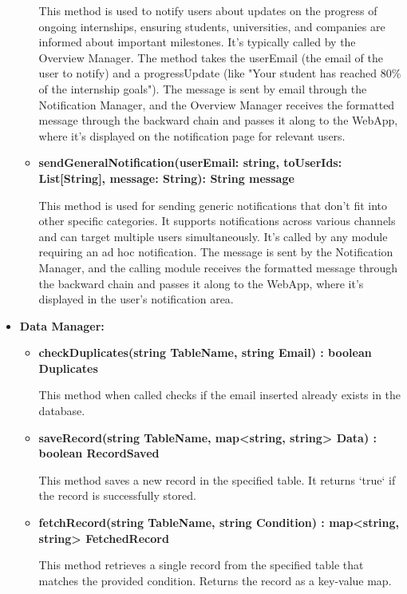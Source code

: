 \begin{itemize}
\begin{itemize}
    This method is used to notify users about updates on the progress of ongoing internships, ensuring students, universities, and companies are informed about important milestones. It’s typically called by the Overview Manager.
    The method takes the userEmail (the email of the user to notify) and a progressUpdate (like "Your student has reached 80\% of the internship goals"). The message is sent by email through the Notification Manager, and the Overview Manager receives the formatted message through the backward chain and passes it along to the WebApp, where it’s displayed on the notification page for relevant users.

    \item \textbf{sendGeneralNotification(userEmail: string, toUserIds: List[String], message: String): String message}
    
    This method is used for sending generic notifications that don’t fit into other specific categories. It supports notifications across various channels and can target multiple users simultaneously. It’s called by any module requiring an ad hoc notification.
    The message is sent by the Notification Manager, and the calling module receives the formatted message through the backward chain and passes it along to the WebApp, where it’s displayed in the user’s notification area.


\end{itemize}


\item \textbf{Data Manager:}
\begin{itemize}

\item \textbf{checkDuplicates(string TableName, string Email) : boolean Duplicates}

This method when called checks if the email inserted already exists in the database.
    
\item \textbf{saveRecord(string TableName, map<string, string> Data) : boolean RecordSaved}  

This method saves a new record in the specified table. It returns `true` if the record is successfully stored.

\item \textbf{fetchRecord(string TableName, string Condition) : map<string, string> FetchedRecord}  

This method retrieves a single record from the specified table that matches the provided condition. Returns the record as a key-value map.


\end{itemize}
\end{itemize}

